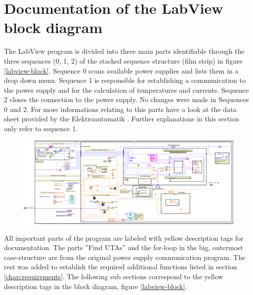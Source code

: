 \documentclass[parskip,12pt,headsepline,a4paper] {scrbook}
\begin{document}
\section{Documentation of the LabView block diagram}
\vspace{-0.5\baselineskip}
The LabView program is divided into three main parts identifiable through the three sequences (0, 1, 2) of the stacked sequence structure (film strip) in figure \ref{labview-block}. Sequence 0 scans available power supplies and lists them in a drop down menu. Sequence 1 is responsible for establishing a communication to the power supply and for the calculation of temperatures and currents. Sequence 2 closes the connection to the power supply. No changes were made in Sequences 0 and 2. For more informations relating to this parts have a look at the data sheet provided by the Elektroautomatik \cite{ref-ps}. Further explanations in this section only refer to sequence 1.

\begin{figure}[ht]
\centerline{
\includegraphics[width=16cm]{./labview/overview.jpg}}
\end{figure}

All important parts of the program are labeled with yellow description tags for documentation. The parts ''Find UTAs'' and the for-loop in the big, outermost case-structure are from the original power supply communication program. The rest was added to establish the required additional functions listed in section \ref{chap:requirements}. The following sub sections correspond to the yellow description tags in the block diagram, figure \ref{labview-block}.
\end{document}
